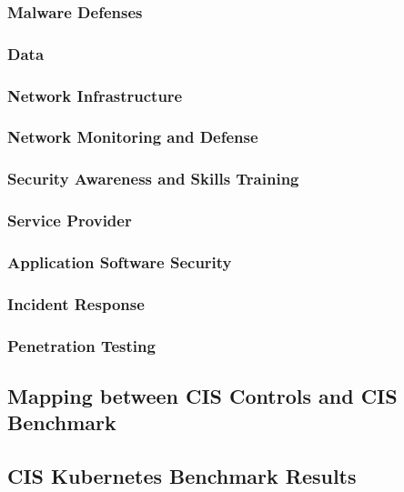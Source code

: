 \subsubsection{Malware Defenses}

\subsubsection{Data}

\subsubsection{Network Infrastructure}

\subsubsection{Network Monitoring and Defense}

\subsubsection{Security Awareness and Skills Training}

\subsubsection{Service Provider}

\subsubsection{Application Software Security}

\subsubsection{Incident Response}

\subsubsection{Penetration Testing}

\subsection{Mapping between CIS Controls and CIS Benchmark}

\subsection{CIS Kubernetes Benchmark Results}
